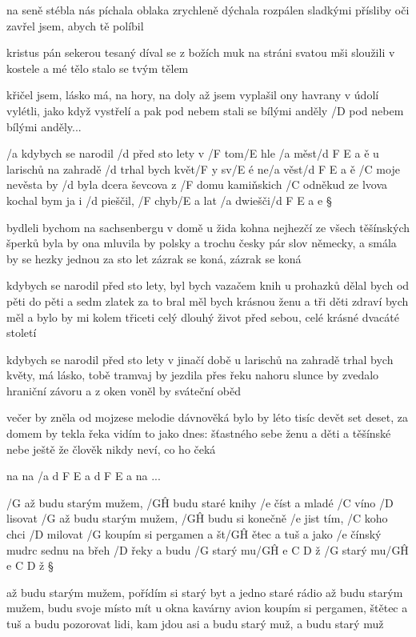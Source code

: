 na seně stébla nás píchala
oblaka zrychleně dýchala
rozpálen sladkými přísliby
oči zavřel jsem, abych tě políbil \s

kristus pán sekerou tesaný
díval se z božích muk na stráni
svatou mši sloužili v kostele
a mé tělo stalo se tvým tělem \s

křičel jsem, lásko má, na hory, na doly
až jsem vyplašil ony havrany v údolí
vylétli, jako když vystřelí
a pak pod nebem stali se bílými anděly
/D pod nebem bílými anděly...




/a kdybych se narodil /d před sto lety v /F tom/E hle /a měst/{d F E a} ě
u larischů na zahradě /d trhal bych květ/F y sv/E é ne/a věst/{d F E a} ě
/C moje nevěsta by /d byla dcera ševcova
z /F domu kamiňskich /C odněkud ze lvova
kochal bym ja i /d pieščil, /F chyb/E a lat /a dwiešči/{d F E a} e \S

bydleli bychom na sachsenbergu v domě u žida kohna
nejhezčí ze všech těšínských šperků byla by ona
mluvila by polsky a trochu česky
pár slov německy, a smála by se hezky
jednou za sto let zázrak se koná, zázrak se koná \s

kdybych se narodil před sto lety, byl bych vazačem knih
u prohazků dělal bych od pěti do pěti a sedm zlatek za to bral 
měl bych krásnou ženu a tři děti
zdraví bych měl a bylo by mi kolem třiceti
celý dlouhý život před sebou, celé krásné dvacáté století \s

kdybych se narodil před sto lety v jinačí době
u larischů na zahradě trhal bych květy, má lásko, tobě
tramvaj by jezdila přes řeku nahoru
slunce by zvedalo hraniční závoru
a z oken voněl by sváteční oběd \s

večer by zněla od mojzese melodie dávnověká
bylo by léto tisíc devět set deset, za domem by tekla řeka
vidím to jako dnes: šťastného sebe
ženu a děti a těšínské nebe
ještě že člověk nikdy neví, co ho čeká \s

na na /{a d F E a d F E a} na ...




/G až budu starým mužem, /G\^H budu staré knihy /e číst
a mladé /C víno /D lisovat
/G až budu starým mužem, /G\^H budu si konečně /e jist
tím, /C koho chci /D milovat
/G koupím si pergamen a št/G\^H ětec a tuš
a jako /e čínský mudrc sednu na břeh /D řeky
a budu /G starý mu/{G\^H e C D} ž
/G starý mu/{G\^H e C D} ž \S

až budu starým mužem, pořídím si starý byt
a jedno staré rádio
až budu starým mužem, budu svoje místo mít
u okna kavárny avion
koupím si pergamen, štětec a tuš
a budu pozorovat lidi, kam jdou asi
a budu starý muž, a budu starý muž \s

